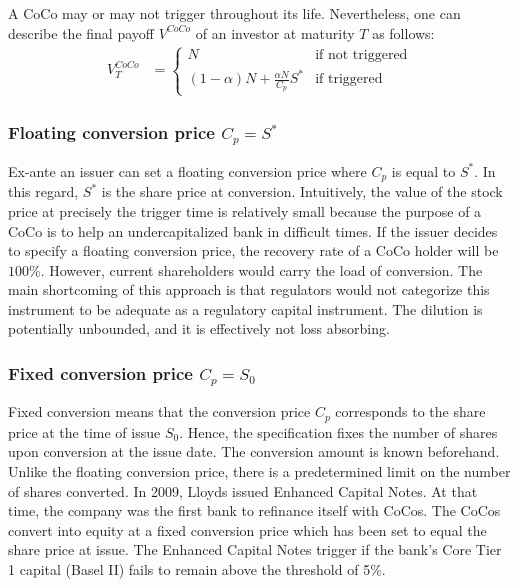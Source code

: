 A CoCo may or may not trigger throughout its life. Nevertheless, one can describe the final payoff $V^{CoCo}$ of an investor at maturity $T$ as follows:
\begin{align}\label{valueatmaturity}
    V^{CoCo}_T &= \begin{cases} N & \text{if not triggered} \\ (1 - \alpha) N + \frac{\alpha N}{C_p} S^{*} & \text{if triggered} \end{cases}
\end{align}

\subsubsection*{Floating conversion price $C_p = S^*$}
Ex-ante an issuer can set a floating conversion price where $C_p$ is equal to $S^*$. In this regard, $S^*$ is the share price at conversion. Intuitively, the value of the stock price at precisely the trigger time is relatively small because the purpose of a CoCo is to help an undercapitalized bank in difficult times. If the issuer decides to specify a floating conversion price, the recovery rate of a CoCo holder will be $100\%$. However, current shareholders would carry the load of conversion. 
The main shortcoming of this approach is that regulators would not categorize this instrument to be adequate as a regulatory capital instrument. The dilution is potentially unbounded, and it is effectively not loss absorbing. \citep{de2014handbook}

\subsubsection*{Fixed conversion price $C_p = S_0$}
Fixed conversion means that the conversion price $C_p$ corresponds to the share price at the time of issue $S_0$. Hence, the specification fixes the number of shares upon conversion at the issue date. The conversion amount is known beforehand. Unlike the floating conversion price, there is a predetermined limit on the number of shares converted. \citep{de2014handbook} In 2009, Lloyds issued Enhanced Capital Notes. At that time, the company was the first bank to refinance itself with CoCos. The CoCos convert into equity at a fixed conversion price which has been set to equal the share price at issue. The Enhanced Capital Notes trigger if the bank's Core Tier 1 capital (Basel II) fails to remain above the threshold of 5\%. \citep{lloyds2009}

